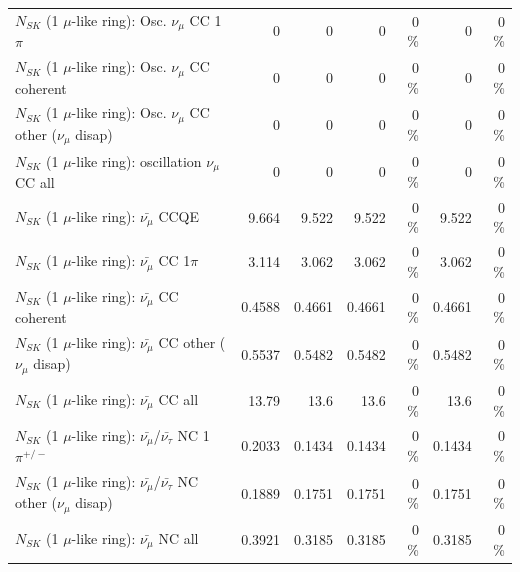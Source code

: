 \begin{table}
\begin{tabular}{| l | r | r | r  r | r  r |}
                          $N_{SK}$ (1 $\mu$-like ring): Osc. $\nu_\mu$ CC 1$\pi$ &               0 &               0 &               0 &        0 \%  &               0 &        0 \%  \\ 
                        $N_{SK}$ (1 $\mu$-like ring): Osc. $\nu_\mu$ CC coherent &               0 &               0 &               0 &        0 \%  &               0 &        0 \%  \\ 
         $N_{SK}$ (1 $\mu$-like ring): Osc. $\nu_\mu$ CC other ($\nu_\mu$ disap) &               0 &               0 &               0 &        0 \%  &               0 &        0 \%  \\ 
                      $N_{SK}$ (1 $\mu$-like ring): oscillation $\nu_\mu$ CC all &               0 &               0 &               0 &        0 \%  &               0 &        0 \%  \\ 
\hline
\hline
                              $N_{SK}$ (1 $\mu$-like ring): $\bar{\nu_\mu}$ CCQE &           9.664 &           9.522 &           9.522 &        0 \%  &           9.522 &        0 \%  \\ 
                         $N_{SK}$ (1 $\mu$-like ring): $\bar{\nu_\mu}$ CC 1$\pi$ &           3.114 &           3.062 &           3.062 &        0 \%  &           3.062 &        0 \%  \\ 
                       $N_{SK}$ (1 $\mu$-like ring): $\bar{\nu_\mu}$ CC coherent &          0.4588 &          0.4661 &          0.4661 &        0 \%  &          0.4661 &        0 \%  \\ 
        $N_{SK}$ (1 $\mu$-like ring): $\bar{\nu_\mu}$ CC other ($\nu_\mu$ disap) &          0.5537 &          0.5482 &          0.5482 &        0 \%  &          0.5482 &        0 \%  \\ 
                          $N_{SK}$ (1 $\mu$-like ring): $\bar{\nu_{\mu}}$ CC all &           13.79 &            13.6 &            13.6 &        0 \%  &            13.6 &        0 \%  \\ 
\hline
  $N_{SK}$ (1 $\mu$-like ring): $\bar{\nu_\mu}$/$\bar{\nu_\tau}$ NC 1$\pi^{+/-}$ &          0.2033 &          0.1434 &          0.1434 &        0 \%  &          0.1434 &        0 \%  \\ 
$N_{SK}$ (1 $\mu$-like ring): $\bar{\nu_\mu}$/$\bar{\nu_\tau}$ NC other ($\nu_\mu$ disap) &          0.1889 &          0.1751 &          0.1751 &        0 \%  &          0.1751 &        0 \%  \\ 
                          $N_{SK}$ (1 $\mu$-like ring): $\bar{\nu_{\mu}}$ NC all &          0.3921 &          0.3185 &          0.3185 &        0 \%  &          0.3185 &        0 \%  \\ 

\end{tabular}
\end{table}
